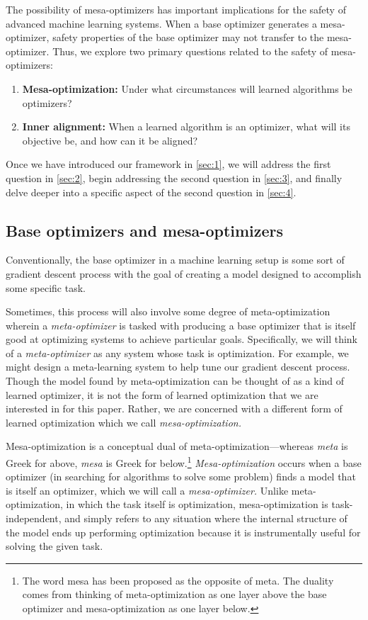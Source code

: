 \documentclass[
  onecolumn,
  natbib,
]{miri-tech-article}
\begin{document}
The possibility of mesa-optimizers has important implications for the safety of advanced machine learning systems. When a base optimizer generates a mesa-optimizer, safety properties of the base optimizer may not transfer to the mesa-optimizer. Thus, we explore two primary questions related to the safety of mesa-optimizers:
\begin{enumerate}
\item \textbf{Mesa-optimization:} Under what circumstances will learned algorithms be optimizers?
\item \textbf{Inner alignment:} When a learned algorithm is an optimizer, what will its objective be, and how can it be aligned?
\end{enumerate}
Once we have introduced our framework in \cref{sec:1}, we will address the first question in \cref{sec:2}, begin addressing the second question in \cref{sec:3}, and finally delve deeper into a specific aspect of the second question in \cref{sec:4}.

\subsection{Base optimizers and mesa-optimizers}
\label{sec:1.1}

Conventionally, the base optimizer in a machine learning setup is some sort of gradient descent process with the goal of creating a model designed to accomplish some specific task.

Sometimes, this process will also involve some degree of meta-optimization wherein a \textit{meta-optimizer} is tasked with producing a base optimizer that is itself good at optimizing systems to achieve particular goals. Specifically, we will think of a \textit{meta-optimizer} as any system whose task is optimization. For example, we might design a meta-learning system to help tune our gradient descent process.\cite{grad_by_grad} Though the model found by meta-optimization can be thought of as a kind of learned optimizer, it is not the form of learned optimization that we are interested in for this paper. Rather, we are concerned with a different form of learned optimization which we call \textit{mesa-optimization.}

Mesa-optimization is a conceptual dual of meta-optimization---whereas \textit{meta} is Greek for above, \textit{mesa} is Greek for below.\footnote{The word mesa has been proposed as the opposite of meta.\cite{mesa} The duality comes from thinking of meta-optimization as one layer above the base optimizer and mesa-optimization as one layer below.} \textit{Mesa-optimization} occurs when a base optimizer (in searching for algorithms to solve some problem) finds a model that is itself an optimizer, which we will call a \textit{mesa-optimizer.} Unlike meta-optimization, in which the task itself is optimization, mesa-optimization is task-independent, and simply refers to any situation where the internal structure of the model ends up performing optimization because it is instrumentally useful for solving the given task.
\end{document}
